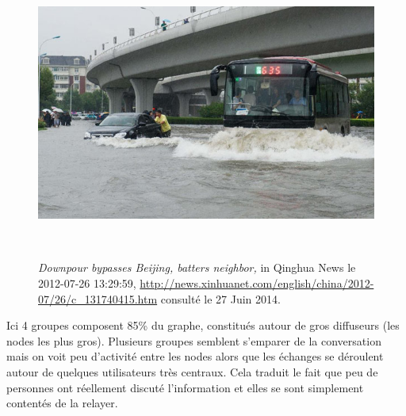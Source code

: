 \begin{figure}
    \centering
    \includegraphics[width=6.0114in,height=3.7894in]{figures/chap3/chapitre3-img16.jpg}
    \caption[Photo de Tianjin durant la pluie torentielle en Juillet 2012]{\textit{Downpour bypasses Beijing, batters neighbor, }in Qinghua News le 2012-07-26 13:29:59, \url{http://news.xinhuanet.com/english/china/2012-07/26/c_131740415.htm} consult\'e le 27 Juin 2014.}
\end{figure}

Ici 4 groupes composent 85\% du graphe, constitu\'es autour de gros
diffuseurs (les nodes les plus gros). Plusieurs groupes semblent
s{\textquoteright}emparer de la conversation mais on voit peu
d{\textquoteright}activit\'e entre les nodes alors que les \'echanges
se d\'eroulent autour de quelques utilisateurs tr\`es centraux. Cela
traduit le fait que peu de personnes ont r\'eellement discut\'e
l{\textquoteright}information et elles se sont simplement content\'es
de la relayer.


